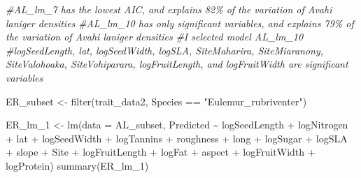 \documentclass[
  12pt,
]{article}
\newenvironment{Shaded}{\begin{snugshade}}{\end{snugshade}}
\newcommand{\AttributeTok}[1]{\textcolor[rgb]{0.77,0.63,0.00}{#1}}
\newcommand{\CommentTok}[1]{\textcolor[rgb]{0.56,0.35,0.01}{\textit{#1}}}
\newcommand{\FunctionTok}[1]{\textcolor[rgb]{0.00,0.00,0.00}{#1}}
\newcommand{\NormalTok}[1]{#1}
\newcommand{\OtherTok}[1]{\textcolor[rgb]{0.56,0.35,0.01}{#1}}
\newcommand{\SpecialCharTok}[1]{\textcolor[rgb]{0.00,0.00,0.00}{#1}}
\newcommand{\StringTok}[1]{\textcolor[rgb]{0.31,0.60,0.02}{#1}}
\begin{document}
\begin{Shaded}
\begin{Highlighting}[]
\CommentTok{\#AL\_lm\_7 has the lowest AIC, and explains 82\% of the variation of Avahi laniger densities }
\CommentTok{\#AL\_lm\_10 has only significant variables, and explains 79\% of the variation of Avahi laniger densities}
\CommentTok{\#I selected model AL\_lm\_10}
\CommentTok{\#logSeedLength, lat, logSeedWidth, logSLA, SiteMaharira, SiteMiaranony, SiteValohoaka, SiteVohiparara, logFruitLength, and logFruitWidth are significant variables}

\NormalTok{ER\_subset }\OtherTok{\textless{}{-}} \FunctionTok{filter}\NormalTok{(trait\_data2, Species }\SpecialCharTok{==} \StringTok{"Eulemur\_rubriventer"}\NormalTok{)}

\NormalTok{ER\_lm\_1 }\OtherTok{\textless{}{-}} \FunctionTok{lm}\NormalTok{(}\AttributeTok{data =}\NormalTok{ AL\_subset, Predicted }\SpecialCharTok{\textasciitilde{}}\NormalTok{ logSeedLength }\SpecialCharTok{+}\NormalTok{ logNitrogen }\SpecialCharTok{+}\NormalTok{ lat }\SpecialCharTok{+}\NormalTok{ logSeedWidth }\SpecialCharTok{+}\NormalTok{ logTannins }\SpecialCharTok{+}\NormalTok{ roughness }\SpecialCharTok{+}\NormalTok{ long }\SpecialCharTok{+}\NormalTok{ logSugar }\SpecialCharTok{+}\NormalTok{ logSLA }\SpecialCharTok{+}\NormalTok{ slope }\SpecialCharTok{+}\NormalTok{ Site }\SpecialCharTok{+}\NormalTok{ logFruitLength }\SpecialCharTok{+}\NormalTok{ logFat }\SpecialCharTok{+}\NormalTok{ aspect }\SpecialCharTok{+}\NormalTok{ logFruitWidth }\SpecialCharTok{+}\NormalTok{ logProtein)}
\FunctionTok{summary}\NormalTok{(ER\_lm\_1)}
\end{Highlighting}
\end{Shaded}
\end{document}
